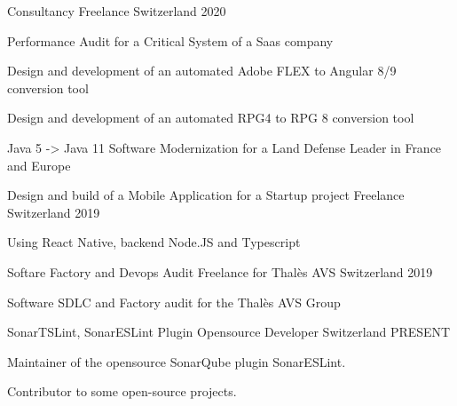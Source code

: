 

\begin{cventries}
\cventry
{Consultancy} %
{Freelance} %
{Switzerland} %
{2020} %
{
  \begin{cvitems} %
    \item {Performance Audit for a Critical System of a Saas company}
    \item {Design and development of an automated Adobe FLEX to Angular 8/9 conversion tool}
    \item {Design and development of an automated RPG4 to RPG 8 conversion tool}
    \item {Java 5 -> Java 11 Software Modernization for a Land Defense Leader in France and Europe}
  \end{cvitems}
}


\cventry
{Design and build of a Mobile Application for a Startup project} %
{Freelance} %
{Switzerland} %
{2019} %
{
  \begin{cvitems} %
  \item {Using React Native, backend Node.JS and Typescript}
  \end{cvitems}
}

\cventry
{Softare Factory and Devops Audit} %
{Freelance for Thalès AVS} %
{Switzerland} %
{2019} %
{
  \begin{cvitems} %
  \item {Software SDLC and Factory audit for the Thalès AVS Group}
  \end{cvitems}
}

  \cventry
    {SonarTSLint, SonarESLint Plugin} %
    {Opensource Developer} %
    {Switzerland} %
    {PRESENT} %
    {
      \begin{cvitems} %
        \item {Maintainer of the opensource SonarQube plugin SonarESLint.}
		\item {Contributor to some open-source projects.}
      \end{cvitems}
    }


\end{cventries}
